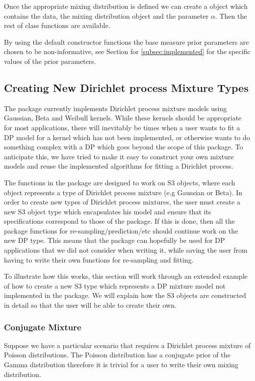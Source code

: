 \documentclass[nojss]{jss}
\begin{document}
Once the appropriate mixing distribution is defined we can create a  object which contains the data, the mixing distribution object and the parameter $\alpha$. Then the rest of  class functions are available.

By using the default constructor functions  the base measure prior parameters are chosen to be non-informative, see Section for \ref{subsec:implemented} for the specific values of the prior parameters.

\subsection{Creating New Dirichlet process Mixture Types} \label{sec:NewMDobj}
The  package currently implements Dirichlet process mixture models using Gaussian, Beta and Weibull kernels. While these kernels should be appropriate for most applications, there will inevitably be times when a user wants to fit a DP model for a kernel which has not been implemented, or otherwise wants to do something complex with a DP which goes beyond the scope of this package. To anticipate this, we have tried to make it easy to construct your own mixture models and reuse the implemented algorithms for fitting a Dirichlet process.

The functions in the package are designed to work on S3  objects, where each object represents a type of Dirichlet process mixture (e.g Gaussian or Beta). In order to create new types of Dirichlet process mixtures, the user must create a new S3 object type which encapsulates his model and ensure that its specifications correspond to those of the package. If this is done, then all the package functions for re-sampling/prediction/etc should continue work on the new DP type. This means that the package can hopefully be used for DP applications that we did not consider when writing it, while saving the user from having to write their own functions for re-sampling and fitting.

To illustrate how this works, this section will work through an extended example of how to create a new S3 type which represents a DP mixture model not implemented in the  package. We will explain how the S3 objects are constructed in detail so that the user will be able to create their own.

\subsubsection{Conjugate Mixture}
Suppose we have a particular scenario that requires a Dirichlet process mixture of Poisson distributions. The Poisson distribution has a conjugate prior of the Gamma distribution therefore it is trivial for a user to write their own mixing distribution.
\end{document}
